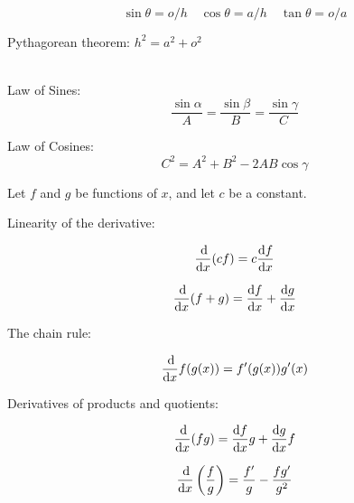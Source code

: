 
\noindent{}\\
  \begin{equation*}
 \sin\theta  = o/h \quad
 \cos\theta = a/h \quad
 \tan\theta = o/a
 \end{equation*}

Pythagorean theorem: $h^2=a^2+o^2$


\\
Law of Sines:
  \begin{equation*} \frac{\sin\alpha}{A}=\frac{\sin\beta}{B}=\frac{\sin\gamma}{C} \end{equation*}

\noindent Law of Cosines:
  \begin{equation*} C^2 = A^2 + B^2 - 2AB \cos \gamma \end{equation*}


\pagebreak[4]


\noindent Let $f$ and $g$ be functions of $x$, and let $c$ be a constant.

\noindent Linearity of the derivative:

\begin{equation*} \frac{\operatorname{d\!}}{\operatorname{d\!} x}(cf)=c \frac{\operatorname{d\!} f}{\operatorname{d\!} x} \end{equation*}

\begin{equation*} \frac{\operatorname{d\!}}{\operatorname{d\!} x}(f+g)=\frac{\operatorname{d\!} f}{\operatorname{d\!} x} + \frac{\operatorname{d\!} g}{\operatorname{d\!} x} \end{equation*}

\noindent The chain rule:

\begin{equation*} \frac{\operatorname{d\!}}{\operatorname{d\!} x}f(g(x)) = f'(g(x))g'(x) \end{equation*}

\noindent Derivatives of products and quotients:

\begin{equation*} \frac{\operatorname{d\!}}{\operatorname{d\!} x} (fg) = \frac{\operatorname{d\!} f}{\operatorname{d\!} x} g + \frac{\operatorname{d\!} g}{\operatorname{d\!} x} f\end{equation*}

\begin{equation*} \frac{\operatorname{d\!}}{\operatorname{d\!} x}\left(\frac{f}{g}\right) = \frac{f'}{g}-\frac{fg'}{g^2}\end{equation*}

